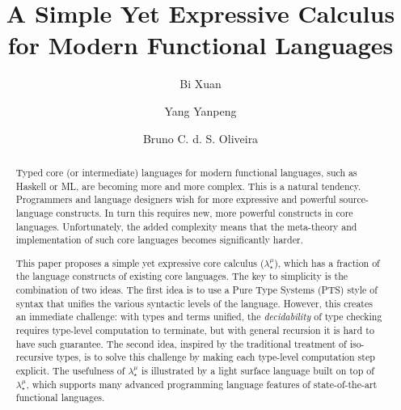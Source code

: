 \documentclass[a4paper]{llncs}
\newcommand{\name}{{\bf $\lambda_{\star}^{\mu}$}\xspace}
\begin{document}
\mainmatter

\title{A Simple Yet Expressive Calculus for Modern Functional Languages}

\author{Bi Xuan \and Yang Yanpeng \and Bruno C. d. S. Oliveira}



\maketitle

\begin{abstract}
Typed core (or intermediate) languages for modern 
functional languages, such as Haskell or ML, 
are becoming more and more complex. This is a natural tendency.
Programmers and language designers wish for more expressive and
powerful source-language constructs. In turn this requires new, more
powerful constructs in core languages. Unfortunately, the added
complexity means that the meta-theory and implementation of such core
languages becomes significantly harder.

This paper proposes a simple yet expressive core calculus (\name),
which has a fraction of the language constructs of existing core
languages. The key to simplicity is the combination of two ideas. The
first idea is to use a Pure Type Systems (PTS) style of syntax that
unifies the various syntactic levels of the language. However, this
creates an immediate challenge: with types and terms unified, the
\emph{decidability} of type checking requires type-level computation
to terminate, but with general recursion it is hard to have such
guarantee. The second idea, inspired by the traditional treatment of
iso-recursive types, is to solve this challenge by making each
type-level computation step explicit. The usefulness of \name is
illustrated by a light surface language built on top of \name, which
supports many advanced programming language features of
state-of-the-art functional languages. 
\end{abstract}
\end{document}
